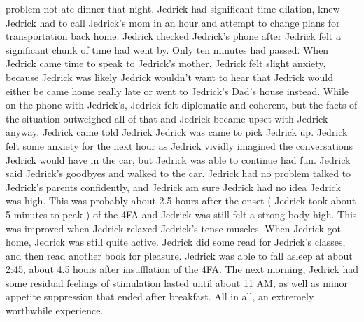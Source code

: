\documentclass[12pt]{book}
\begin{document}
problem not ate dinner that night. Jedrick had significant time dilation, knew Jedrick had to call Jedrick's mom in an hour and attempt to change plans for transportation back home. Jedrick checked Jedrick's phone after Jedrick felt a significant chunk of time had went by. Only ten minutes had passed. When Jedrick came time to speak to Jedrick's mother, Jedrick felt slight anxiety, because Jedrick was likely Jedrick wouldn't want to hear that Jedrick would either be came home really late or went to Jedrick's Dad's house instead. While on the phone with Jedrick's, Jedrick felt diplomatic and coherent, but the facts of the situation outweighed all of that and Jedrick became upset with Jedrick anyway. Jedrick came told Jedrick Jedrick was came to pick Jedrick up. Jedrick felt some anxiety for the next hour as Jedrick vividly imagined the conversations Jedrick would have in the car, but Jedrick was able to continue had fun. Jedrick said Jedrick's goodbyes and walked to the car. Jedrick had no problem talked to Jedrick's parents confidently, and Jedrick am sure Jedrick had no idea Jedrick was high. This was probably about 2.5 hours after the onset ( Jedrick took about 5 minutes to peak ) of the 4FA and Jedrick was still felt a strong body high. This was improved when Jedrick relaxed Jedrick's tense muscles. When Jedrick got home, Jedrick was still quite active. Jedrick did some read for Jedrick's classes, and then read another book for pleasure. Jedrick was able to fall asleep at about 2:45, about 4.5 hours after insufflation of the 4FA. The next morning, Jedrick had some residual feelings of stimulation lasted until about 11 AM, as well as minor appetite suppression that ended after breakfast. All in all, an extremely worthwhile experience.
\end{document}
